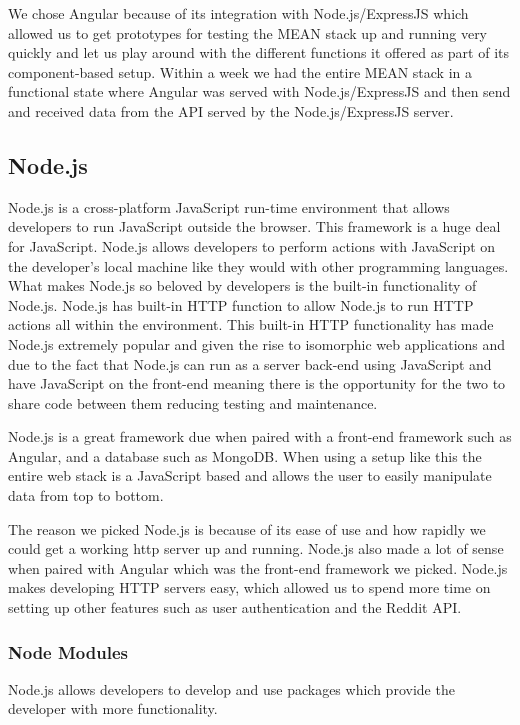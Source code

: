 We chose Angular because of its integration with Node.js/ExpressJS which allowed us to get prototypes for testing the MEAN stack up and running very quickly and let us play around with the different functions it offered as part of its component-based setup. Within a week we had the entire MEAN stack in a functional state where Angular was served with Node.js/ExpressJS and then send and received data from the API served by the Node.js/ExpressJS server.

\subsection{Node.js}
Node.js is a cross-platform JavaScript run-time environment that allows developers to run JavaScript outside the browser. This framework is a huge deal for JavaScript. Node.js allows developers to perform actions with JavaScript on the developer's local machine like they would with other programming languages. What makes Node.js so beloved by developers is the built-in functionality of Node.js. Node.js has built-in HTTP function to allow Node.js to run HTTP actions all within the environment. This built-in HTTP functionality has made Node.js extremely popular and given the rise to isomorphic web applications and due to the fact that Node.js can run as a server back-end using JavaScript and have JavaScript on the front-end meaning there is the opportunity for the two to share code between them reducing testing and maintenance.

Node.js is a great framework due when paired with a front-end framework such as Angular, and a database such as MongoDB. When using a setup like this the entire web stack is a JavaScript based and allows the user to easily manipulate data from top to bottom.

The reason we picked Node.js is because of its ease of use and how rapidly we could get a working http server up and running. Node.js also made a lot of sense when paired with Angular which was the front-end framework we picked. Node.js makes developing HTTP servers easy, which allowed us to spend more time on setting up other features such as user authentication and the Reddit API. 

\subsubsection{Node Modules}
Node.js allows developers to develop and use packages which provide the developer with more functionality.


